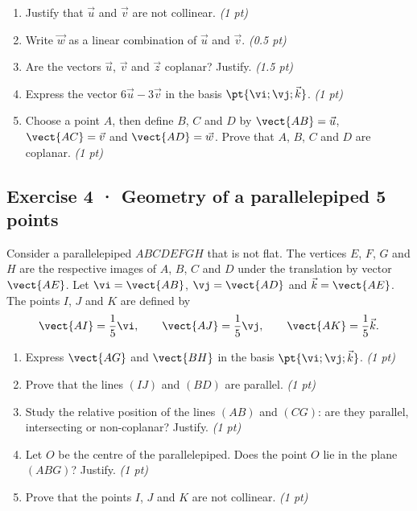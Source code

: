 \begin{enumerate}

\item Justify that $\vec u$ and $\vec v$ are not collinear. \hfill\textit{(1 pt)}

\item Write $\vec w$ as a linear combination of $\vec u$ and $\vec v$. \hfill\textit{(0.5 pt)}

\item Are the vectors $\vec u$, $\vec v$ and $\vec z$ coplanar? Justify. \hfill\textit{(1.5 pt)}

\item Express the vector $6\vec u-3\vec v$ in the basis $\pt{\vi;\vj;\vec k}$. \hfill\textit{(1 pt)}

\item Choose a point $A$, then define $B$, $C$ and $D$ by $\vect{AB}=\vec u$, $\vect{AC}=\vec v$ and $\vect{AD}=\vec w$. Prove that $A$, $B$, $C$ and $D$ are coplanar. \hfill\textit{(1 pt)}

\end{enumerate}

\subsection*{Exercise 4 · Geometry of a parallelepiped \hfill 5 points}Consider a parallelepiped $ABCDEFGH$ that is not flat. The vertices $E$, $F$, $G$ and $H$ are the respective images of $A$, $B$, $C$ and $D$ under the translation by vector $\vect{AE}$.
Let $\vi=\vect{AB}$, $\vj=\vect{AD}$ and $\vec k=\vect{AE}$.
The points $I$, $J$ and $K$ are defined by
\[\vect{AI}=\frac1{5}\vi,\qquad\vect{AJ}=\frac1{5}\vj,\qquad\vect{AK}=\frac1{5}\vec k.\]

\begin{enumerate}

\item Express $\vect{AG}$ and $\vect{BH}$ in the basis $\pt{\vi;\vj;\vec k}$. \hfill\textit{(1 pt)}

\item Prove that the lines $(IJ)$ and $(BD)$ are parallel. \hfill\textit{(1 pt)}

\item Study the relative position of the lines $(AB)$ and $(CG)$: are they parallel, intersecting or non-coplanar? Justify. \hfill\textit{(1 pt)}

\item Let $O$ be the centre of the parallelepiped. Does the point $O$ lie in the plane $(ABG)$? Justify. \hfill\textit{(1 pt)}

\item Prove that the points $I$, $J$ and $K$ are not collinear. \hfill\textit{(1 pt)}

\end{enumerate}

